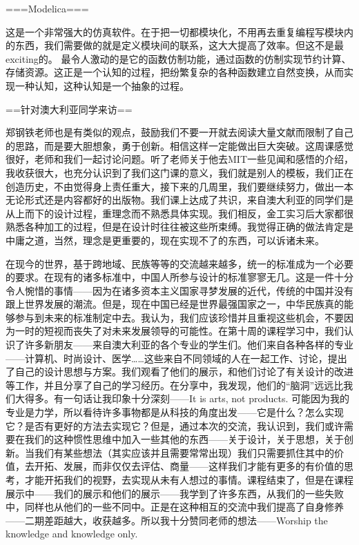 \documentclass[11pt,fleqn]{book}
\numberwithin{dummy}{section}
\theoremstyle{ocrenumbox}
\theoremstyle{blacknumex}
\theoremstyle{blacknumbox}
\theoremstyle{ocrenum}
\newenvironment{remark}[1]{\par\vspace{10pt}\small %
	\begin{list}{}{
			\leftmargin=35pt %
			\rightmargin=25pt}\item\ignorespaces %
		\makebox[-2.5pt]{\begin{tikzpicture}[overlay]
			\node[draw=ocre!60,line width=1pt,circle,fill=ocre!25,font=\sffamily\bfseries,inner sep=2pt,outer sep=0pt] at (-15pt,0pt){\textcolor{ocre}{#1}};\end{tikzpicture}} %
		\advance\baselineskip -1pt}{\end{list}\vskip5pt} %
\newlength\esp
\begin{document}
\begin{remark}{黄}
===Modelica===

这是一个非常强大的仿真软件。在于把一切都模块化，不用再去重复编程写模块内的东西，我们需要做的就是定义模块间的联系，这大大提高了效率。但这不是最exciting的。
最令人激动的是它的函数仿制功能，通过函数的仿制实现节约计算、存储资源。这正是一个认知的过程，把纷繁复杂的各种函数建立自然变换，从而实现一种认知，这种认知是一个抽象的过程。

==针对澳大利亚同学来访==

郑钢铁老师也是有类似的观点，鼓励我们不要一开就去阅读大量文献而限制了自己的思路，而是要大胆想象，勇于创新。相信这样一定能做出巨大突破。这周课感觉很好，老师和我们一起讨论问题。听了老师关于他去MIT一些见闻和感悟的介绍，我收获很大，也充分认识到了我们这门课的意义，我们就是别人的模板，我们正在创造历史，不由觉得身上责任重大，接下来的几周里，我们要继续努力，做出一本无论形式还是内容都好的出版物。我们课上达成了共识，来自澳大利亚的同学们是从上而下的设计过程，重理念而不熟悉具体实现。我们相反，金工实习后大家都很熟悉各种加工的过程，但是在设计时往往被这些所束缚。我觉得正确的做法肯定是中庸之道，当然，理念是更重要的，现在实现不了的东西，可以诉诸未来。
\end{remark}

\begin{remark}{康}
	在现今的世界，基于跨地域、民族等等的交流越来越多，统一的标准成为一个必要的要求。在现有的诸多标准中，中国人所参与设计的标准寥寥无几。这是一件十分令人惋惜的事情——因为在诸多资本主义国家寻梦发展的近代，传统的中国并没有跟上世界发展的潮流。但是，现在中国已经是世界最强国家之一，中华民族真的能够参与到未来的标准制定中去。我认为，我们应该珍惜并且重视这些机会，不要因为一时的短视而丧失了对未来发展领导的可能性。在第十周的课程学习中，我们认识了许多新朋友——来自澳大利亚的各个专业的学生们。他们来自各种各样的专业——计算机、时尚设计、医学……这些来自不同领域的人在一起工作、讨论，提出了自己的设计思想与方案。我们观看了他们的展示，和他们讨论了有关设计的改进等工作，并且分享了自己的学习经历。在分享中，我发现，他们的“脑洞”远远比我们大得多。有一句话让我印象十分深刻——It is arts, not products. 可能因为我的专业是力学，所以看待许多事物都是从科技的角度出发——它是什么？怎么实现它？是否有更好的方法去实现它？但是，通过本次的交流，我认识到，我们或许需要在我们的这种惯性思维中加入一些其他的东西——关于设计，关于思想，关于创新。当我们有某些想法（其实应该并且需要常常出现）我们只需要抓住其中的价值，去开拓、发展，而非仅仅去评估、商量——这样我们才能有更多的有价值的思考，才能开拓我们的视野，去实现从未有人想过的事情。课程结束了，但是在课程展示中——我们的展示和他们的展示——我学到了许多东西，从我们的一些失败中，同样也从他们的一些不同中。正是在这种相互的交流中我们提高了自身修养——二期差距越大，收获越多。所以我十分赞同老师的想法——Worship the knowledge and knowledge only.
\end{remark}
\end{document}
